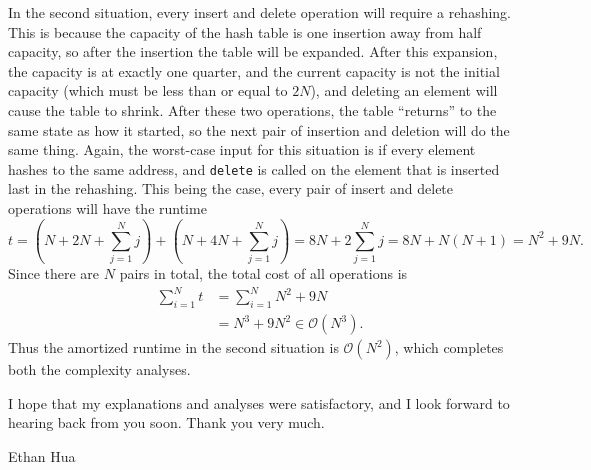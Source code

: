\documentclass[11pt]{article}
\begin{document}
    In the second situation, every insert and delete operation will require a rehashing. This is because the capacity of the hash table is one insertion away from half capacity, so after the insertion the table will be expanded. After this expansion, the capacity is at exactly one quarter, and the current capacity is not the initial capacity (which must be less than or equal to \(2N\)), and deleting an element will cause the table to shrink. After these two operations, the table ``returns'' to the same state as how it started, so the next pair of insertion and deletion will do the same thing. Again, the worst-case input for this situation is if every element hashes to the same address, and \texttt{delete} is called on the element that is inserted last in the rehashing. This being the case, every pair of insert and delete operations will have the runtime
    \[
        t = \left(N + 2N + \sum_{j=1}^{N} j\right) + \left( N + 4N + \sum_{j=1}^{N} j \right) = 8N + 2\sum_{j=1}^{N} j = 8N + N(N+1) = N^2 + 9N.
    \]
    Since there are \(N\) pairs in total, the total cost of all operations is
    \begin{align*}
        \sum_{i=1}^{N} t &= \sum_{i=1}^{N} N^2 + 9N \\
        &= N^3 + 9N^2 \in \mathcal{O} (N^3).
    \end{align*}
    Thus the amortized runtime in the second situation is \(\mathcal{O} (N^2)\), which completes both the complexity analyses.
    
    I hope that my explanations and analyses were satisfactory, and I look forward to hearing back from you soon. Thank you very much.

    \medskip

    Ethan Hua
\end{document}
